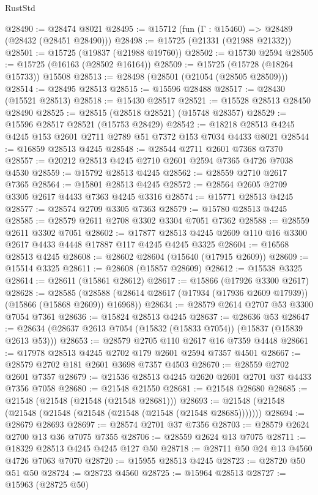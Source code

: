 \begin{lexlean}{RustStd}
\begin{coremodule}
@28490 := @28474 @8021
@28495 := @15712 (fun (Γ : @15460) => @28489 (@28432 (@28451 @28490)))
@28498 := @15725 (@21331 (@21988 @21332))
@28501 := @15725 (@19837 (@21988 @19760))
@28502 := @15730 @2594
@28505 := @15725 (@16163 (@28502 @16164))
@28509 := @15725 (@15728 (@18264 @15733)) @15508
@28513 := @28498 (@28501 (@21054 (@28505 @28509)))
@28514 := @28495 @28513
@28515 := @15596 @28488
@28517 := @28430 (@15521 @28513)
@28518 := @15430 @28517
@28521 := @15528 @28513 @28450 @28490
@28525 := @28515 (@28518 @28521) (@15748 @28357)
@28529 := @15596 @28517 @28521 (@15753 @28429)
@28542 := @18218 @28513 @4245 @4245 @153 @2601 @2711 @2789 @51 @7372 @153 @7034 @4433 @8021
@28544 := @16859 @28513 @4245
@28548 := @28544 @2711 @2601 @7368 @7370
@28557 := @20212 @28513 @4245 @2710 @2601 @2594 @7365 @4726 @7038 @4530
@28559 := @15792 @28513 @4245
@28562 := @28559 @2710 @2617 @7365
@28564 := @15801 @28513 @4245
@28572 := @28564 @2605 @2709 @3305 @2617 @4433 @7363 @4245 @3316
@28574 := @15771 @28513 @4245
@28577 := @28574 @2709 @3305 @7363
@28579 := @15780 @28513 @4245
@28585 := @28579 @2611 @2708 @3302 @3304 @7051 @7362
@28588 := @28559 @2611 @3302 @7051
@28602 := @17877 @28513 @4245 @2609 @110 @16 @3300 @2617 @4433 @4448 @17887 @117 @4245 @4245 @3325
@28604 := @16568 @28513 @4245
@28608 := @28602 @28604 (@15640 (@17915 @2609))
@28609 := @15514 @3325
@28611 := @28608 (@15857 @28609)
@28612 := @15538 @3325
@28614 := @28611 (@15861 @28612)
@28617 := @15866 (@17926 @3300 @2617)
@28628 := @28585
    (@28588 (@28614 @28617 (@17934 (@17936 @2609 @17939)) (@15866 (@15868 @2609)) @16968))
@28634 := @28579 @2614 @2707 @53 @3300 @7054 @7361
@28636 := @15824 @28513 @4245
@28637 := @28636 @53
@28647 := @28634 (@28637 @2613 @7054 (@15832 (@15833 @7054)) (@15837 (@15839 @2613 @53)))
@28653 := @28579 @2705 @110 @2617 @16 @7359 @4448
@28661 := @17978 @28513 @4245 @2702 @179 @2601 @2594 @7357 @4501
@28667 := @28579 @2702 @181 @2601 @3698 @7357 @4503
@28670 := @28559 @2702 @2601 @7357
@28679 := @21536 @28513 @4245 @2620 @2601 @2701 @37 @4433 @7356 @7058
@28680 := @21548 @21550
@28681 := @21548 @28680
@28685 := @21548 (@21548 (@21548 (@21548 @28681)))
@28693 := @21548 (@21548 (@21548 (@21548 (@21548 (@21548 (@21548 (@21548 @28685)))))))
@28694 := @28679 @28693
@28697 := @28574 @2701 @37 @7356
@28703 := @28579 @2624 @2700 @13 @36 @7075 @7355
@28706 := @28559 @2624 @13 @7075
@28711 := @18329 @28513 @4245 @4245 @127 @50
@28718 := @28711 @50 @24 @13 @4560 @4726 @7063 @7070
@28720 := @15955 @28513 @4245
@28723 := @28720 @50 @51 @50
@28724 := @28723 @4560
@28725 := @15964 @28513
@28727 := @15963 (@28725 @50)

\end{coremodule}
\end{lexlean}
